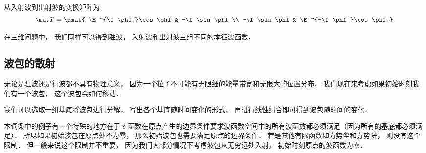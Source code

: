 从入射波到出射波的变换矩阵为
\begin{equation}
\mat T = \pmat{
\E^{\I\phi}\cos\phi & -\I \sin\phi \\
-\I \sin\phi & \E^{-\I\phi}\cos\phi
}\end{equation}

在三维问题中， 我们同样可以得到驻波， 入射波和出射波三组不同的本征波函数．

\subsection{波包的散射}
无论是驻波还是行波都不具有物理意义， 因为一个粒子不可能有无限细的能量带宽和无限大的位置分布． 我们现在来考虑如果初始时刻我们有一个波包， 这个波包会如何移动．

我们可以选取一组基底将波包进行分解， 写出各个基底随时间变化的形式， 再进行线性组合即可得到波包随时间的变化．

本词条中的例子有一个特殊的地方在于 $\delta$ 函数在原点产生的边界条件要求波函数空间中的所有波函数都必须满足（因为所有的基底都必须满足）． 所以如果初始波包在原点处不为零， 那么初始波包也需要满足原点的边界条件． 若是其他有限函数如方势垒和方势阱， 则没有这个限制． 但一般来说这个限制并不重要， 因为我们大部分情况下考虑波包从无穷远处入射， 初始时刻原点的波函数为零．


